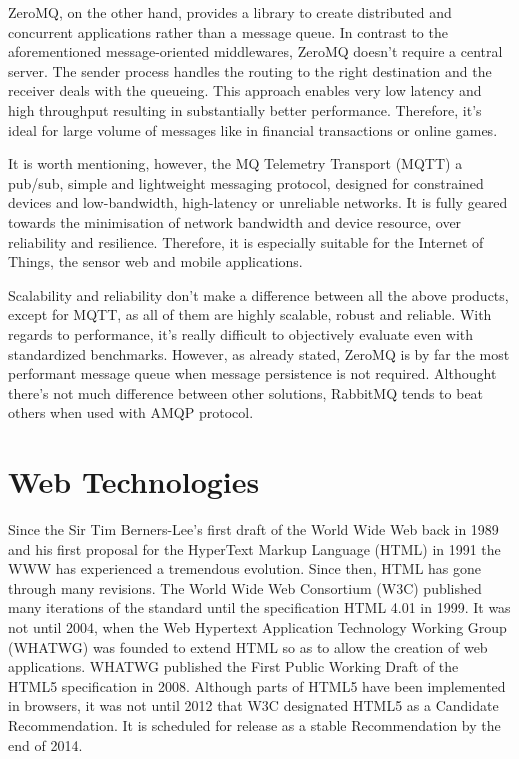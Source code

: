 ZeroMQ, on the other hand, provides a library to create distributed and concurrent applications rather than a message queue. In contrast to the aforementioned message-oriented middlewares, ZeroMQ doesn't require a central server. The sender process handles the routing to the right destination and the receiver deals with the queueing. This approach enables very low latency and high throughput resulting in substantially better performance. Therefore, it's ideal for large volume of messages like in financial transactions or online games.

It is worth mentioning, however, the MQ Telemetry Transport (MQTT) a pub/sub, simple and lightweight messaging protocol, designed for constrained devices and low-bandwidth, high-latency or unreliable networks. It is fully geared towards the minimisation of network bandwidth and device resource, over reliability and resilience. Therefore, it is especially suitable for the Internet of Things, the sensor web and mobile applications.

Scalability and reliability don't make a difference between all the above products, except for MQTT, as all of them are highly scalable, robust and reliable. With regards to performance, it's really difficult to objectively evaluate even with standardized benchmarks. However, as already stated, ZeroMQ is by far the most performant message queue when message persistence is not required. Althought there's not much difference between other solutions, RabbitMQ tends to beat others when used with AMQP protocol.

\section{Web Technologies}

Since the Sir Tim Berners-Lee's first draft of the World Wide Web back in 1989 and his first proposal for the HyperText Markup Language (HTML) \cite{HTMLtags} in 1991 the WWW has experienced a tremendous evolution. Since then, HTML has gone through many revisions. The World Wide Web Consortium (W3C) published many iterations of the standard until the specification HTML 4.01 in 1999. It was not until 2004, when the Web Hypertext Application Technology Working Group (WHATWG) was founded to extend HTML so as to allow the creation of web applications. WHATWG published the First Public Working Draft of the HTML5 specification in 2008. Although parts of HTML5 have been implemented in browsers, it was not until 2012 that W3C designated HTML5 as a Candidate Recommendation. It is scheduled for release as a stable Recommendation by the end of 2014.

